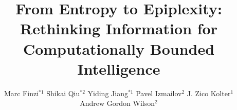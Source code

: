 \documentclass[twoside]{article}
\begin{document}
\title{From Entropy to Epiplexity: Rethinking Information for Computationally Bounded Intelligence}


\author{\centering Marc Finzi$^{*1}$ \quad Shikai Qiu$^{*2}$ \quad Yiding Jiang$^{*1}$ \quad Pavel Izmailov$^2$ \quad J. Zico Kolter$^1$ \\ Andrew Gordon Wilson$^2$ \\[0.4em]
}

\editor{}

\maketitle
\end{document}
